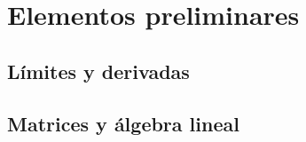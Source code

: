 
\chapter{Elementos preliminares}


\newpage

\newpage


\newpage
\section{Límites y derivadas}

\newpage
\section{Matrices y álgebra lineal}

